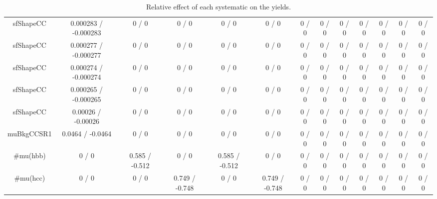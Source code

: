 \documentclass[10pt]{article}
\begin{document}
\begin{table}[htbp]
\begin{center}
\begin{tabular}{|c|c|c|c|c|c|c|c|c|c|c|c|c|}
  sfShapeCC & 0.000283 / -0.000283 & 0 / 0 & 0 / 0 & 0 / 0 & 0 / 0 & 0 / 0 & 0 / 0 & 0 / 0 & 0 / 0 & 0 / 0 & 0 / 0 & 0 / 0 \\ 
  sfShapeCC & 0.000277 / -0.000277 & 0 / 0 & 0 / 0 & 0 / 0 & 0 / 0 & 0 / 0 & 0 / 0 & 0 / 0 & 0 / 0 & 0 / 0 & 0 / 0 & 0 / 0 \\ 
  sfShapeCC & 0.000274 / -0.000274 & 0 / 0 & 0 / 0 & 0 / 0 & 0 / 0 & 0 / 0 & 0 / 0 & 0 / 0 & 0 / 0 & 0 / 0 & 0 / 0 & 0 / 0 \\ 
  sfShapeCC & 0.000265 / -0.000265 & 0 / 0 & 0 / 0 & 0 / 0 & 0 / 0 & 0 / 0 & 0 / 0 & 0 / 0 & 0 / 0 & 0 / 0 & 0 / 0 & 0 / 0 \\ 
  sfShapeCC & 0.00026 / -0.00026 & 0 / 0 & 0 / 0 & 0 / 0 & 0 / 0 & 0 / 0 & 0 / 0 & 0 / 0 & 0 / 0 & 0 / 0 & 0 / 0 & 0 / 0 \\ 
  muBkgCCSR1 & 0.0464 / -0.0464 & 0 / 0 & 0 / 0 & 0 / 0 & 0 / 0 & 0 / 0 & 0 / 0 & 0 / 0 & 0 / 0 & 0 / 0 & 0 / 0 & 0 / 0 \\ 
  #mu(hbb) & 0 / 0 & 0.585 / -0.512 & 0 / 0 & 0.585 / -0.512 & 0 / 0 & 0 / 0 & 0 / 0 & 0 / 0 & 0 / 0 & 0 / 0 & 0 / 0 & 0 / 0 \\ 
  #mu(hcc) & 0 / 0 & 0 / 0 & 0.749 / -0.748 & 0 / 0 & 0.749 / -0.748 & 0 / 0 & 0 / 0 & 0 / 0 & 0 / 0 & 0 / 0 & 0 / 0 & 0 / 0 \\ 
\hline 
\end{tabular} 
\caption{Relative effect of each systematic on the yields.} 
\end{center} 
\end{table} 
\end{document}
